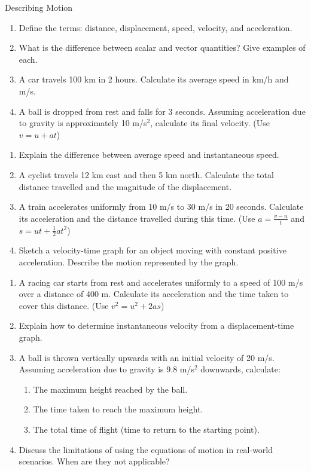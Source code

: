 \begin{tieredquestions}{Describing Motion}

\begin{enumerate}[label=\textbf{Basic Questions}]
    \item Define the terms: distance, displacement, speed, velocity, and acceleration.
    \item What is the difference between scalar and vector quantities? Give examples of each.
    \item A car travels 100 km in 2 hours. Calculate its average speed in km/h and m/s.
    \item A ball is dropped from rest and falls for 3 seconds. Assuming acceleration due to gravity is approximately 10 m/s$^2$, calculate its final velocity. (Use $v=u+at$)
\end{enumerate}

\begin{enumerate}[resume, label=\textbf{Intermediate Questions}]
    \item Explain the difference between average speed and instantaneous speed.
    \item A cyclist travels 12 km east and then 5 km north. Calculate the total distance travelled and the magnitude of the displacement.
    \item A train accelerates uniformly from 10 m/s to 30 m/s in 20 seconds. Calculate its acceleration and the distance travelled during this time. (Use $a = \frac{v-u}{t}$ and $s = ut + \frac{1}{2}at^2$)
    \item Sketch a velocity-time graph for an object moving with constant positive acceleration. Describe the motion represented by the graph.
\end{enumerate}

\begin{enumerate}[resume, label=\textbf{Advanced Questions}]
    \item A racing car starts from rest and accelerates uniformly to a speed of 100 m/s over a distance of 400 m. Calculate its acceleration and the time taken to cover this distance. (Use $v^2 = u^2 + 2as$)
    \item Explain how to determine instantaneous velocity from a displacement-time graph.
    \item A ball is thrown vertically upwards with an initial velocity of 20 m/s. Assuming acceleration due to gravity is 9.8 m/s$^2$ downwards, calculate:
    \begin{enumerate}
        \item The maximum height reached by the ball.
        \item The time taken to reach the maximum height.
        \item The total time of flight (time to return to the starting point).
    \end{enumerate}
    \item Discuss the limitations of using the equations of motion in real-world scenarios. When are they not applicable?
\end{enumerate}

\end{tieredquestions}

